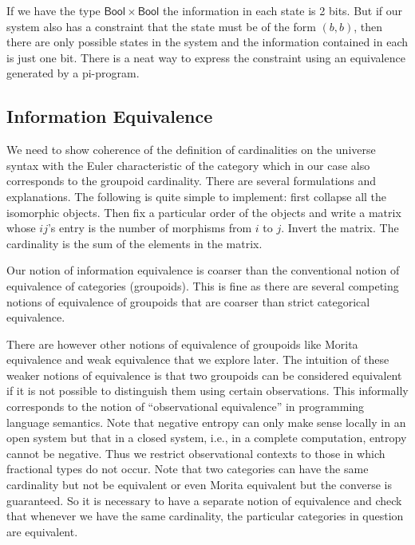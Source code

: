 If we have the type $\mathsf{Bool} \times \mathsf{Bool}$ the
information in each state is 2 bits. But if our system also has a
constraint that the state must be of the form $(b,b)$, then there are
only possible states in the system and the information contained in
each is just one bit. There is a neat way to express the constraint
using an equivalence generated by a pi-program.
  
\subsection{Information Equivalence}
  
We need to show coherence of the definition of cardinalities on the
universe syntax with the Euler characteristic of the category which in
our case also corresponds to the groupoid cardinality. There are
several formulations and explanations. The following is quite simple
to implement: first collapse all the isomorphic objects. Then fix a
particular order of the objects and write a matrix whose $ij$'s entry
is the number of morphisms from $i$ to $j$. Invert the matrix. The
cardinality is the sum of the elements in the matrix.

Our notion of information equivalence is coarser than the conventional
notion of equivalence of categories (groupoids). This is fine as there
are several competing notions of equivalence of groupoids that are
coarser than strict categorical equivalence.

There are however other notions of equivalence of groupoids like
Morita equivalence and weak equivalence that we explore later. The
intuition of these weaker notions of equivalence is that two groupoids
can be considered equivalent if it is not possible to distinguish them
using certain observations. This informally corresponds to the notion
of ``observational equivalence'' in programming language
semantics. Note that negative entropy can only make sense locally in
an open system but that in a closed system, i.e., in a complete
computation, entropy cannot be negative. Thus we restrict
observational contexts to those in which fractional types do not
occur. Note that two categories can have the same cardinality but not
be equivalent or even Morita equivalent but the converse is
guaranteed. So it is necessary to have a separate notion of
equivalence and check that whenever we have the same cardinality, the
particular categories in question are equivalent.


